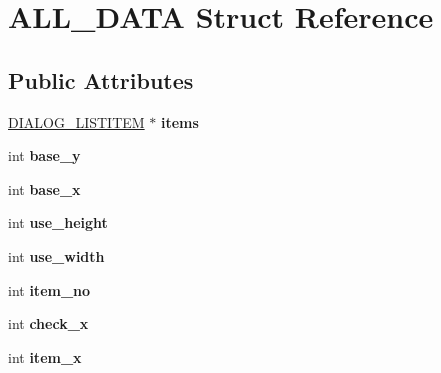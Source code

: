 \hypertarget{struct_a_l_l___d_a_t_a}{}\section{A\+L\+L\+\_\+\+D\+A\+TA Struct Reference}
\label{struct_a_l_l___d_a_t_a}
\subsection*{Public Attributes}
\begin{DoxyCompactItemize}
\item 
\hyperlink{struct_d_i_a_l_o_g___l_i_s_t_i_t_e_m}{D\+I\+A\+L\+O\+G\+\_\+\+L\+I\+S\+T\+I\+T\+EM} $\ast$ {\bfseries items}\hypertarget{struct_a_l_l___d_a_t_a_a4ac5c27c1acf09ef96d23b55e1550691}{}\label{struct_a_l_l___d_a_t_a_a4ac5c27c1acf09ef96d23b55e1550691}

\item 
int {\bfseries base\+\_\+y}\hypertarget{struct_a_l_l___d_a_t_a_a6e38ab38427a1549589de1b7f76094ed}{}\label{struct_a_l_l___d_a_t_a_a6e38ab38427a1549589de1b7f76094ed}

\item 
int {\bfseries base\+\_\+x}\hypertarget{struct_a_l_l___d_a_t_a_a64ad6183c9bc2db455335588c0d68c10}{}\label{struct_a_l_l___d_a_t_a_a64ad6183c9bc2db455335588c0d68c10}

\item 
int {\bfseries use\+\_\+height}\hypertarget{struct_a_l_l___d_a_t_a_a29e185a9f824d1b2296af9cd23ac61c5}{}\label{struct_a_l_l___d_a_t_a_a29e185a9f824d1b2296af9cd23ac61c5}

\item 
int {\bfseries use\+\_\+width}\hypertarget{struct_a_l_l___d_a_t_a_ab663e0614569bd9c99036f44c515ec68}{}\label{struct_a_l_l___d_a_t_a_ab663e0614569bd9c99036f44c515ec68}

\item 
int {\bfseries item\+\_\+no}\hypertarget{struct_a_l_l___d_a_t_a_ac0810e30768ed46a8e76dd9468d2f3c7}{}\label{struct_a_l_l___d_a_t_a_ac0810e30768ed46a8e76dd9468d2f3c7}

\item 
int {\bfseries check\+\_\+x}\hypertarget{struct_a_l_l___d_a_t_a_a44e3c64ca476abf1aa5b51869cd6a772}{}\label{struct_a_l_l___d_a_t_a_a44e3c64ca476abf1aa5b51869cd6a772}

\item 
int {\bfseries item\+\_\+x}\hypertarget{struct_a_l_l___d_a_t_a_a12cc71eb0250fa95386c8942b9f5e541}{}\label{struct_a_l_l___d_a_t_a_a12cc71eb0250fa95386c8942b9f5e541}


\end{DoxyCompactItemize}
